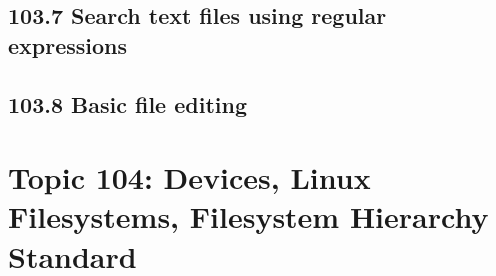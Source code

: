 \documentclass[a4paper]{report}
\begin{document}



\section*{103.7 Search text files using regular expressions}




\section*{103.8 Basic file editing}




\chapter{Topic 104: Devices, Linux Filesystems, Filesystem Hierarchy Standard}
\end{document}
